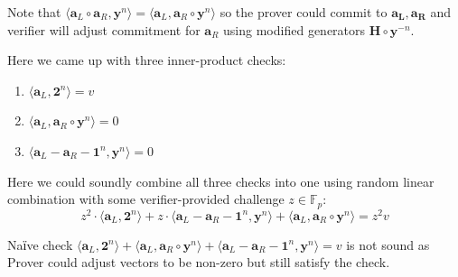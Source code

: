\documentclass[../lecture-notes-148x210.tex]{subfiles}
\begin{document}
Note that $\langle \mathbf{a}_L \circ \mathbf{a}_R, \mathbf{y}^n \rangle = \langle \mathbf{a}_L, \mathbf{a}_R \circ \mathbf{y}^n \rangle$ so the prover could commit to $\mathbf{a_L, a_R}$ and verifier will adjust commitment for $\mathbf{a}_R$ using modified generators $\mathbf{H} \circ \mathbf{y}^{-n}$.

Here we came up with three inner-product checks:
\begin{enumerate}
    \item $\langle \mathbf{a}_L, \mathbf{2}^n \rangle = v$
    \item $\langle \mathbf{a}_L, \mathbf{a}_R \circ \mathbf{y}^n \rangle = 0$
    \item $\langle \mathbf{a}_L - \mathbf{a}_R - \mathbf{1}^n, \mathbf{y}^n \rangle = 0$
\end{enumerate}

Here we could soundly combine all three checks into one using random linear combination with some verifier-provided challenge $z \in \mathbb{F}_p$:
$$z^2 \cdot \langle \mathbf{a}_L, \mathbf{2}^n \rangle + z \cdot \langle \mathbf{a}_L - \mathbf{a}_R - \mathbf{1}^n, \mathbf{y}^n \rangle + \langle \mathbf{a}_L, \mathbf{a}_R \circ \mathbf{y}^n \rangle = z^2v$$

\begin{remark}
    Naїve check $\langle \mathbf{a}_L, \mathbf{2}^n \rangle + \langle \mathbf{a}_L, \mathbf{a}_R \circ \mathbf{y}^n \rangle + \langle \mathbf{a}_L - \mathbf{a}_R - \mathbf{1}^n, \mathbf{y}^n \rangle = v$ is not sound as Prover could adjust vectors to be non-zero but still satisfy the check.
\end{remark}
\end{document}

